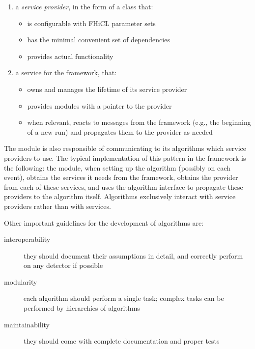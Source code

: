 \begin{enumerate}
   \item
      a \emph{service provider}, in the form of a class that:
      \begin{itemize}
         \item
            is configurable with FHiCL parameter sets
         \item
            has the minimal convenient set of dependencies
         \item
            provides actual functionality
      \end{itemize}
   \item
      a service for the \ART framework, that:
      \begin{itemize}
         \item
            owns and manages the lifetime of its service provider
         \item
            provides modules with a pointer to the provider
         \item
            when relevant, reacts to messages from the framework (e.g., the
            beginning of a new run) and propagates them to the provider as needed
      \end{itemize}
\end{enumerate}
The module is also responsible of communicating to its algorithms which
service providers to use.
\label{response:0201.1}
The typical implementation of this pattern in the \ART framework is the following:
the module, when setting up the algorithm (possibly on each event),
obtains the services it needs from the framework,
obtains the provider from each of these services,
and uses the algorithm interface to propagate these providers to the algorithm itself.
\label{response:0205.1}
Algorithms exclusively interact with service providers rather than with \ART services.

Other important guidelines for the development of algorithms are:

\begin{description}
   \item[interoperability]
      they should document their assumptions in detail,
      and correctly perform on any detector if possible
   \item[modularity]
      each algorithm should perform a single task;
      complex tasks can be performed by hierarchies of algorithms
   \item[maintainability]
      they should come with complete documentation and proper tests
\end{description}

